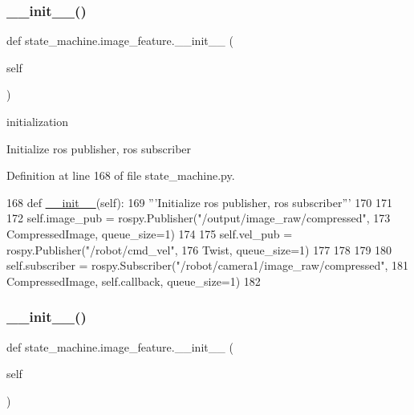 \subsubsection{\texorpdfstring{\+\_\+\+\_\+init\+\_\+\+\_\+()}{\_\_init\_\_()}\hspace{0.1cm}{\footnotesize\ttfamily [1/2]}}
{\footnotesize\ttfamily def state\+\_\+machine.\+image\+\_\+feature.\+\_\+\+\_\+init\+\_\+\+\_\+ (\begin{DoxyParamCaption}\item[{}]{self }\end{DoxyParamCaption})}



initialization 

\begin{DoxyVerb}Initialize ros publisher, ros subscriber\end{DoxyVerb}
 

Definition at line 168 of file state\+\_\+machine.\+py.


\begin{DoxyCode}
168     \textcolor{keyword}{def }\hyperlink{classstate__machine_1_1Play_a5993a23d8be7f7b2647f71ede0334957}{\_\_init\_\_}(self):
169         \textcolor{stringliteral}{'''Initialize ros publisher, ros subscriber'''}
170 
171         
172         self.image\_pub = rospy.Publisher(\textcolor{stringliteral}{"/output/image\_raw/compressed"},
173                                          CompressedImage, queue\_size=1)
174 
175         self.vel\_pub = rospy.Publisher(\textcolor{stringliteral}{"/robot/cmd\_vel"},
176                                        Twist, queue\_size=1)
177  
178 
179         
180         self.subscriber = rospy.Subscriber(\textcolor{stringliteral}{"/robot/camera1/image\_raw/compressed"},
181                                            CompressedImage, self.callback,  queue\_size=1)
182 
\end{DoxyCode}
\mbox{\label{classstate__machine_1_1image__feature_a719ee46dbe292cfe76d9b20b3d752b9e}} 
\subsubsection{\texorpdfstring{\+\_\+\+\_\+init\+\_\+\+\_\+()}{\_\_init\_\_()}\hspace{0.1cm}{\footnotesize\ttfamily [2/2]}}
{\footnotesize\ttfamily def state\+\_\+machine.\+image\+\_\+feature.\+\_\+\+\_\+init\+\_\+\+\_\+ (\begin{DoxyParamCaption}\item[{}]{self }\end{DoxyParamCaption})}




